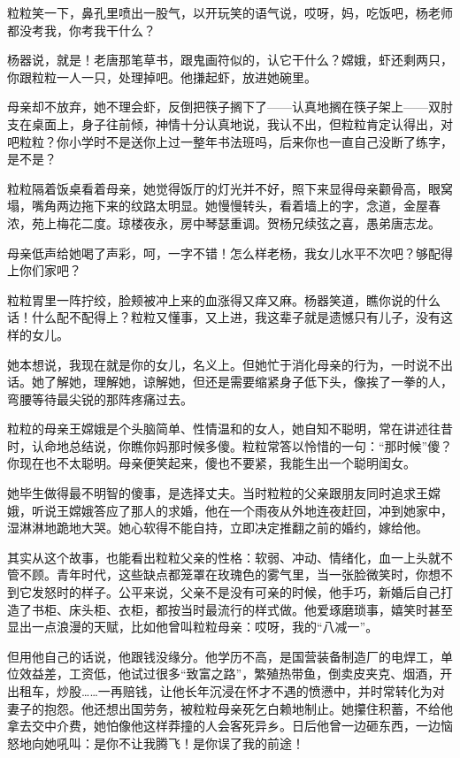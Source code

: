 \documentclass[lang=cn,newtx,12pt,scheme=chinese]{elegantbook}
\begin{document}
粒粒笑一下，鼻孔里喷出一股气，以开玩笑的语气说，哎呀，妈，吃饭吧，杨老师都没考我，你考我干什么？

杨器说，就是！老唐那笔草书，跟鬼画符似的，认它干什么？嫦娥，虾还剩两只，你跟粒粒一人一只，处理掉吧。他搛起虾，放进她碗里。

母亲却不放弃，她不理会虾，反倒把筷子搁下了——认真地搁在筷子架上——双肘支在桌面上，身子往前倾，神情十分认真地说，我认不出，但粒粒肯定认得出，对吧粒粒？你小学时不是送你上过一整年书法班吗，后来你也一直自己没断了练字，是不是？

粒粒隔着饭桌看着母亲，她觉得饭厅的灯光并不好，照下来显得母亲颧骨高，眼窝塌，嘴角两边拖下来的纹路太明显。她慢慢转头，看着墙上的字，念道，金屋春浓，苑上梅花二度。琼楼夜永，房中琴瑟重调。贺杨兄续弦之喜，愚弟唐志龙。

母亲低声给她喝了声彩，呵，一字不错！怎么样老杨，我女儿水平不次吧？够配得上你们家吧？

粒粒胃里一阵拧绞，脸颊被冲上来的血涨得又痒又麻。杨器笑道，瞧你说的什么话！什么配不配得上？粒粒又懂事，又上进，我这辈子就是遗憾只有儿子，没有这样的女儿。

她本想说，我现在就是你的女儿，名义上。但她忙于消化母亲的行为，一时说不出话。她了解她，理解她，谅解她，但还是需要缩紧身子低下头，像挨了一拳的人，弯腰等待最尖锐的那阵疼痛过去。

粒粒的母亲王嫦娥是个头脑简单、性情温和的女人，她自知不聪明，常在讲述往昔时，认命地总结说，你瞧你妈那时候多傻。粒粒常答以怜惜的一句：“那时候”傻？你现在也不太聪明。母亲便笑起来，傻也不要紧，我能生出一个聪明闺女。

她毕生做得最不明智的傻事，是选择丈夫。当时粒粒的父亲跟朋友同时追求王嫦娥，听说王嫦娥答应了那人的求婚，他在一个雨夜从外地连夜赶回，冲到她家中，湿淋淋地跪地大哭。她心软得不能自持，立即决定推翻之前的婚约，嫁给他。

其实从这个故事，也能看出粒粒父亲的性格：软弱、冲动、情绪化，血一上头就不管不顾。青年时代，这些缺点都笼罩在玫瑰色的雾气里，当一张脸微笑时，你想不到它发怒时的样子。公平来说，父亲不是没有可亲的时候，他手巧，新婚后自己打造了书柜、床头柜、衣柜，都按当时最流行的样式做。他爱琢磨琐事，嬉笑时甚至显出一点浪漫的天赋，比如他曾叫粒粒母亲：哎呀，我的“八减一”。

但用他自己的话说，他跟钱没缘分。他学历不高，是国营装备制造厂的电焊工，单位效益差，工资低，他试过很多“致富之路”，繁殖热带鱼，倒卖皮夹克、烟酒，开出租车，炒股……一再赔钱，让他长年沉浸在怀才不遇的愤懑中，并时常转化为对妻子的抱怨。他还想出国劳务，被粒粒母亲死乞白赖地制止。她攥住积蓄，不给他拿去交中介费，她怕像他这样莽撞的人会客死异乡。日后他曾一边砸东西，一边恼怒地向她吼叫：是你不让我腾飞！是你误了我的前途！
\end{document}
